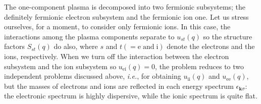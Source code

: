 \documentclass[aps,showkeys,noshowpacs,superscriptaddress,pre,preprint]{revtex4-2}
\begin{document}
The one-component plasma is decomposed into two fermionic subsystems; the definitely fermionic electron subsystem and the fermionic ion one.
Let us stress ourselves, for a moment, to consider only fermionic ions.
In this case, the interactions among the plasma components separate to $u_{st} (q)$ 
so the structure factors $S_{st} (q)$ do also,
where $s$ and $t \left( = \mathrm{e} \;\textrm{and}\; \mathrm{i} \right)$ denote the electrons and the ions, respectively.
When we turn off the interaction between the electron subsystem and the ion subsystem so $u_\mathrm{ei} (q) = 0$, 
the problem reduces to two independent problems discussed above,
\textit{i.e.}, for obtaining $u_\mathrm{ii} (q)$ and $u_\mathrm{ee} (q)$,
but the masses of electrons and ions are reflected in each energy spectrum $\epsilon_{\mathbf{k}\sigma}$:
the electronic spectrum is highly dispersive, while the ionic spectrum is quite flat.
\end{document}
